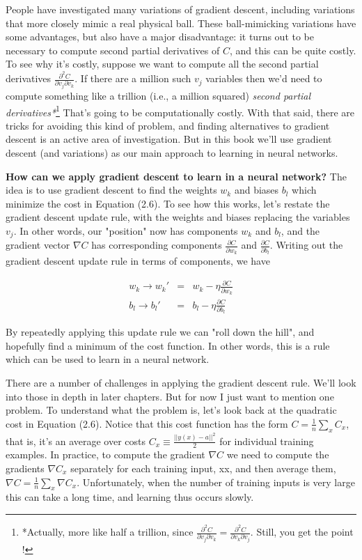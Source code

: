 \documentclass[a4paper,12pt]{report}%
\begin{document}
People have investigated many variations of gradient descent, including variations that more closely mimic a real physical ball. These ball-mimicking variations have some advantages, but also have a major disadvantage: it turns out to be necessary to compute second partial derivatives of $C$, and this can be quite costly. To see why it's costly, suppose we want to compute all the second partial derivatives $\frac{\partial ^{2}C}{\partial v_{j} \partial v_{k}}$. If there are a million such $v_{j}$ variables then we'd need to compute something like a trillion (i.e., a million squared) {\it second partial derivatives*}\footnote{\color{blue} *Actually, more like half a trillion, since $\frac{∂^{2}C}{∂v_{j}∂v_{k}} = \frac{∂^{2}C}{∂v_{k}∂v_{j}}$. Still, you get the point !} That's going to be computationally costly. With that said, there are tricks for avoiding this kind of problem, and finding alternatives to gradient descent is an active area of investigation. But in this book we'll use gradient descent (and variations) as our main approach to learning in neural networks.

{\bf How can we apply gradient descent to learn in a neural network?} The idea is to use gradient descent to find the weights $w_{k}$ and biases $b_{l}$ which minimize the cost in Equation (2.6). To see how this works, let's restate the gradient descent update rule, with the weights and biases replacing the variables $v_{j}$. In other words, our "position" now has components $w_{k}$ and $b_{l}$, and the gradient vector $\nabla C$ has corresponding components $\frac{∂C}{∂w_{k}}$ and $\frac{∂C}{∂b_{l}}$. Writing out the gradient descent update rule in terms of components, we have

\begin{eqnarray}
  w_{k} \rightarrow  w_{k}' &=& w_{k} - \eta \frac{\partial C}{\partial w_{k}} \\
  b_{l} \rightarrow  b_{l}' &=& b_{l} - \eta \frac{\partial C}{\partial b_{l}}
\end{eqnarray}

By repeatedly applying this update rule we can "roll down the hill", and hopefully find a minimum of the cost function. In other words, this is a rule which can be used to learn in a neural network.

There are a number of challenges in applying the gradient descent rule. We'll look into those in depth in later chapters. But for now I just want to mention one problem. To understand what the problem is, let's look back at the quadratic cost in Equation (2.6). Notice that this cost function has the form $C = \frac{1}{n}\sum_{x} C_{x}$, that is, it's an average over costs $ C_{x} \equiv \frac{||y(x)−a||^{2}}{2}$ for individual training examples. In practice, to compute the gradient $\nabla C$ we need to compute the gradients $\nabla C_{x}$ separately for each training input, xx, and then average them, $\nabla C = \frac{1}{n} \sum_{x} \nabla C_{x} $. Unfortunately, when the number of training inputs is very large this can take a long time, and learning thus occurs slowly.
\end{document}
